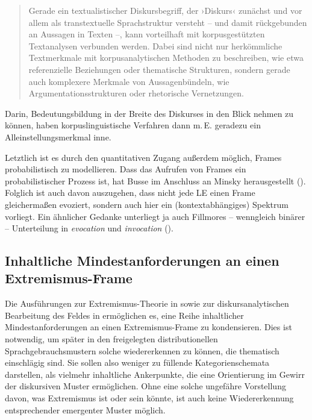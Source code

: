 \begin{quote}
Gerade ein textualistischer Diskursbegriff, der ›Diskurs‹ zunächst und vor allem als transtextuelle Sprachstruktur versteht -- und damit rückgebunden an Aussagen in Texten --, kann vorteilhaft mit korpusgestützten Textanalysen verbunden werden. Dabei sind nicht nur herkömmliche Textmerkmale mit korpusanalytischen Methoden zu beschreiben, wie etwa referenzielle Beziehungen oder thematische Strukturen, sondern gerade auch komplexere Merkmale von Aussagenbündeln, wie Argumentationsstrukturen oder rhetorische Vernetzungen. \autocite[33]{spitzmullerDiskurslinguistikEinfuhrungTheorien2011}
\end{quote}

Darin, Bedeutungsbildung in der Breite des Diskurses in den Blick nehmen zu können, haben korpuslinguistische Verfahren dann m.\,E. geradezu ein Alleinstellungsmerkmal inne.

Letztlich ist es durch den quantitativen Zugang außerdem möglich, Frames probabilistisch zu modellieren. Dass das Aufrufen von Frames ein probabilistischer Prozess ist, hat Busse im Anschluss an Minsky herausgestellt (). Folglich ist auch davon auszugehen, dass nicht jede LE einen Frame gleichermaßen evoziert, sondern auch hier ein (kontextabhängiges) Spektrum vorliegt. Ein ähnlicher Gedanke unterliegt ja auch Fillmores -- wenngleich binärer -- Unterteilung in \emph{evocation} und \emph{invocation} ().

\subsection{Inhaltliche Mindestanforderungen an einen Extremismus-Frame}\label{inhaltliche-mindestanforderungen-an-einen-extremismus-frame}

Die Ausführungen zur Extremismus-Theorie in  sowie zur diskursanalytischen Bearbeitung des Feldes in  ermöglichen es, eine Reihe inhaltlicher Mindestanforderungen an einen Extremismus-Frame zu kondensieren. Dies ist notwendig, um später in den freigelegten distributionellen Sprachgebrauchsmustern solche wiedererkennen zu können, die thematisch einschlägig sind. Sie sollen also weniger zu füllende Kategorienschemata darstellen, als vielmehr inhaltliche Ankerpunkte, die eine Orientierung im Gewirr der diskursiven Muster ermöglichen. Ohne eine solche ungefähre Vorstellung davon, was Extremismus ist oder sein könnte, ist auch keine Wiedererkennung entsprechender emergenter Muster möglich.


